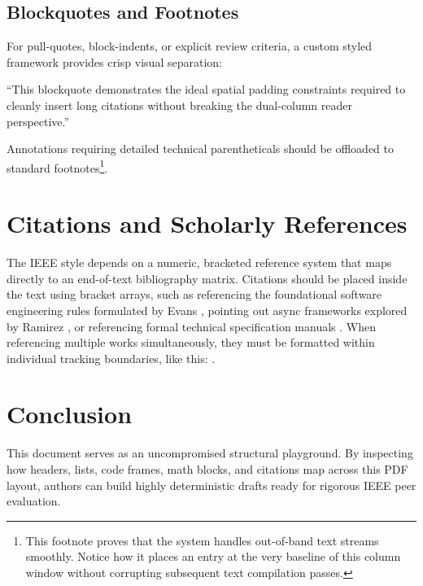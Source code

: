 \documentclass[10pt, journal, compsoc]{IEEEtran}
\begin{document}
\subsection{Blockquotes and Footnotes}
For pull-quotes, block-indents, or explicit review criteria, a custom styled framework provides crisp visual separation:
\begin{tcolorbox}[colback=blockquotebg, colframe=blockquoteleft, leftrule=4pt, rightrule=0pt, toprule=0pt, bottomrule=0pt, sharp corners]
	``This blockquote demonstrates the ideal spatial padding constraints required to cleanly insert long citations without breaking the dual-column reader perspective.''
\end{tcolorbox}
Annotations requiring detailed technical parentheticals should be offloaded to standard footnotes\footnote{This footnote proves that the system handles out-of-band text streams smoothly. Notice how it places an entry at the very baseline of this column window without corrupting subsequent text compilation passes.}.
\section{Citations and Scholarly References}
The IEEE style depends on a numeric, bracketed reference system that maps directly to an end-of-text bibliography matrix. Citations should be placed inside the text using bracket arrays, such as referencing the foundational software engineering rules formulated by Evans \cite{ieee_evans}, pointing out async frameworks explored by Ramirez \cite{ieee_ramirez}, or referencing formal technical specification manuals \cite{ieee_manual}. When referencing multiple works simultaneously, they must be formatted within individual tracking boundaries, like this: \cite{ieee_evans, ieee_ramirez}.

\section{Conclusion}
This document serves as an uncompromised structural playground. By inspecting how headers, lists, code frames, math blocks, and citations map across this PDF layout, authors can build highly deterministic drafts ready for rigorous IEEE peer evaluation.



\end{document}
